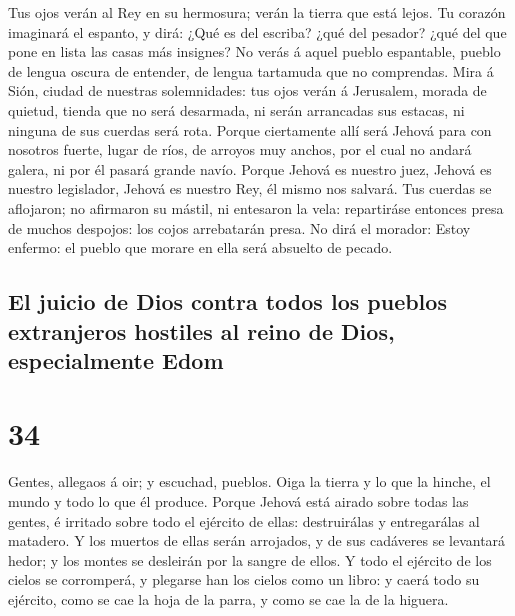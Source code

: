  Tus ojos verán al Rey en su hermosura; verán la tierra que
está lejos.  Tu corazón imaginará el espanto, y dirá: ¿Qué
es del escriba? ¿qué del pesador? ¿qué del que pone en lista las casas
más insignes?  No verás á aquel pueblo espantable, pueblo
de lengua oscura de entender, de lengua tartamuda que no comprendas.
 Mira á Sión, ciudad de nuestras solemnidades: tus ojos
verán á Jerusalem, morada de quietud, tienda que no será desarmada, ni
serán arrancadas sus estacas, ni ninguna de sus cuerdas será rota.
 Porque ciertamente allí será Jehová para con nosotros
fuerte, lugar de ríos, de arroyos muy anchos, por el cual no andará
galera, ni por él pasará grande navío.  Porque Jehová es
nuestro juez, Jehová es nuestro legislador, Jehová es nuestro Rey, él
mismo nos salvará.  Tus cuerdas se aflojaron; no afirmaron
su mástil, ni entesaron la vela: repartiráse entonces presa de muchos
despojos: los cojos arrebatarán presa.  No dirá el morador:
Estoy enfermo: el pueblo que morare en ella será absuelto de pecado.

\hypertarget{el-juicio-de-dios-contra-todos-los-pueblos-extranjeros-hostiles-al-reino-de-dios-especialmente-edom}{%
\subsection{El juicio de Dios contra todos los pueblos extranjeros
hostiles al reino de Dios, especialmente
Edom}\label{el-juicio-de-dios-contra-todos-los-pueblos-extranjeros-hostiles-al-reino-de-dios-especialmente-edom}}

\hypertarget{section-33}{%
\section{34}\label{section-33}}

 Gentes, allegaos á oir; y escuchad, pueblos. Oiga la tierra
y lo que la hinche, el mundo y todo lo que él produce. 
Porque Jehová está airado sobre todas las gentes, é irritado sobre todo
el ejército de ellas: destruirálas y entregarálas al matadero.
 Y los muertos de ellas serán arrojados, y de sus cadáveres
se levantará hedor; y los montes se desleirán por la sangre de ellos.
 Y todo el ejército de los cielos se corromperá, y plegarse
han los cielos como un libro: y caerá todo su ejército, como se cae la
hoja de la parra, y como se cae la de la higuera.

